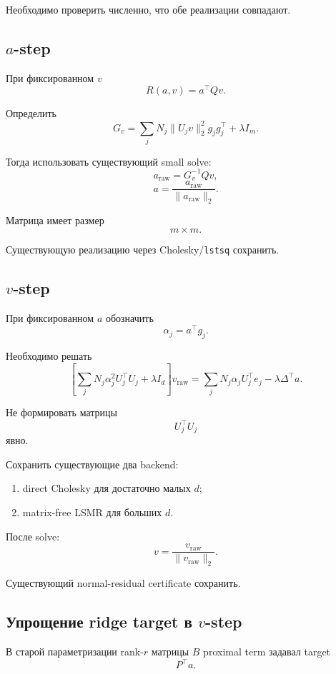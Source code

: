 Необходимо проверить численно, что обе реализации совпадают.

\subsection{$a$-step}

При фиксированном $v$
\[
    R(a,v)=a^\top Qv.
\]

Определить
\[
\boxed{
    G_v
    =
    \sum_j
    N_j
    \|U_jv\|_2^2
    g_jg_j^\top
    +
    \lambda I_m.
}
\]

Тогда использовать существующий small solve:
\[
\boxed{
    a_{\mathrm{raw}}
    =
    G_v^{-1}Qv,
}
\]
\[
\boxed{
    a
    =
    \frac{a_{\mathrm{raw}}}
         {\|a_{\mathrm{raw}}\|_2}.
}
\]

Матрица имеет размер
\[
    m\times m.
\]

Существующую реализацию через Cholesky/\texttt{lstsq}
сохранить.

\subsection{$v$-step}

При фиксированном $a$ обозначить
\[
    \alpha_j=a^\top g_j.
\]

Необходимо решать
\[
\boxed{
\left[
    \sum_j
    N_j\alpha_j^2
    U_j^\top U_j
    +
    \lambda I_d
\right]
v_{\mathrm{raw}}
=
\sum_j
N_j\alpha_j
U_j^\top e_j
-
\lambda\Delta^\top a.
}
\]

Не формировать матрицы
\[
    U_j^\top U_j
\]
явно.

Сохранить существующие два backend:
\begin{enumerate}
    \item direct Cholesky для достаточно малых $d$;
    \item matrix-free LSMR для больших $d$.
\end{enumerate}

После solve:
\[
\boxed{
    v
    =
    \frac{v_{\mathrm{raw}}}
         {\|v_{\mathrm{raw}}\|_2}.
}
\]

Существующий normal-residual certificate сохранить.

\subsection{Упрощение ridge target в $v$-step}

В старой параметризации rank-$r$ матрицы $B$ proximal term
задавал target
\[
    P^\top a.
\]

